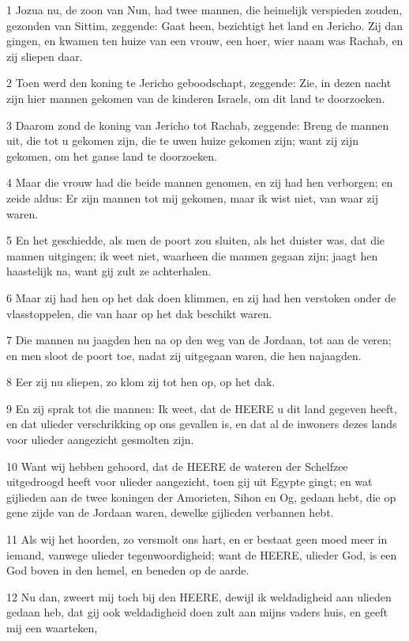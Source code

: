 \par 1 Jozua nu, de zoon van Nun, had twee mannen, die heimelijk verspieden zouden, gezonden van Sittim, zeggende: Gaat heen, bezichtigt het land en Jericho. Zij dan gingen, en kwamen ten huize van een vrouw, een hoer, wier naam was Rachab, en zij sliepen daar.
\par 2 Toen werd den koning te Jericho geboodschapt, zeggende: Zie, in dezen nacht zijn hier mannen gekomen van de kinderen Israels, om dit land te doorzoeken.
\par 3 Daarom zond de koning van Jericho tot Rachab, zeggende: Breng de mannen uit, die tot u gekomen zijn, die te uwen huize gekomen zijn; want zij zijn gekomen, om het ganse land te doorzoeken.
\par 4 Maar die vrouw had die beide mannen genomen, en zij had hen verborgen; en zeide aldus: Er zijn mannen tot mij gekomen, maar ik wist niet, van waar zij waren.
\par 5 En het geschiedde, als men de poort zou sluiten, als het duister was, dat die mannen uitgingen; ik weet niet, waarheen die mannen gegaan zijn; jaagt hen haastelijk na, want gij zult ze achterhalen.
\par 6 Maar zij had hen op het dak doen klimmen, en zij had hen verstoken onder de vlasstoppelen, die van haar op het dak beschikt waren.
\par 7 Die mannen nu jaagden hen na op den weg van de Jordaan, tot aan de veren; en men sloot de poort toe, nadat zij uitgegaan waren, die hen najaagden.
\par 8 Eer zij nu sliepen, zo klom zij tot hen op, op het dak.
\par 9 En zij sprak tot die mannen: Ik weet, dat de HEERE u dit land gegeven heeft, en dat ulieder verschrikking op ons gevallen is, en dat al de inwoners dezes lands voor ulieder aangezicht gesmolten zijn.
\par 10 Want wij hebben gehoord, dat de HEERE de wateren der Schelfzee uitgedroogd heeft voor ulieder aangezicht, toen gij uit Egypte gingt; en wat gijlieden aan de twee koningen der Amorieten, Sihon en Og, gedaan hebt, die op gene zijde van de Jordaan waren, dewelke gijlieden verbannen hebt.
\par 11 Als wij het hoorden, zo versmolt ons hart, en er bestaat geen moed meer in iemand, vanwege ulieder tegenwoordigheid; want de HEERE, ulieder God, is een God boven in den hemel, en beneden op de aarde.
\par 12 Nu dan, zweert mij toch bij den HEERE, dewijl ik weldadigheid aan ulieden gedaan heb, dat gij ook weldadigheid doen zult aan mijns vaders huis, en geeft mij een waarteken,
